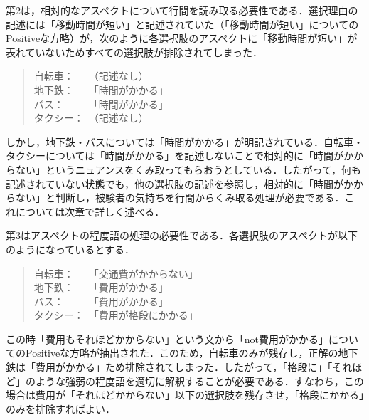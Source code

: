 \documentclass[japanese]{jnlp_1.3a}
\begin{document}
第2は，相対的なアスペクトについて行間を読み取る必要性である．選択理由の記述には「移動時間が短い」と記述されていた（「移動時間が短い」についてのPositiveな方略）が，次のように各選択肢のアスペクトに「移動時間が短い」が表れていないためすべての選択肢が排除されてしまった．
	\begin{quote}
	自転車：　　（記述なし）\\
	地下鉄：　　「時間がかかる」\\
	バス：　　　「時間がかかる」\\
	タクシー：　（記述なし）
	\end{quote}
しかし，地下鉄・バスについては「時間がかかる」が明記されている．自転車・タクシーについては「時間がかかる」を記述しないことで相対的に「時間がかからない」というニュアンスをくみ取ってもらおうとしている．したがって，何も記述されていない状態でも，他の選択肢の記述を参照し，相対的に「時間がかからない」と判断し，被験者の気持ちを行間からくみ取る処理が必要である．これについては次章で詳しく述べる．

第3はアスペクトの程度語の処理の必要性である．各選択肢のアスペクトが以下のようになっているとする．
	\begin{quote}
	自転車：　　「交通費がかからない」\\
	地下鉄：　　「費用がかかる」\\
	バス：　　　「費用がかかる」\\
	タクシー：　「費用が格段にかかる」
	\end{quote}
この時「費用もそれほどかからない」という文から「not費用がかかる」についてのPositiveな方略が抽出された．このため，自転車のみが残存し，正解の地下鉄は「費用がかかる」ため排除されてしまった．したがって，「格段に」「それほど」のような強弱の程度語を適切に解釈することが必要である．すなわち，この場合は費用が「それほどかからない」以下の選択肢を残存させ，「格段にかかる」のみを排除すればよい．
\end{document}
